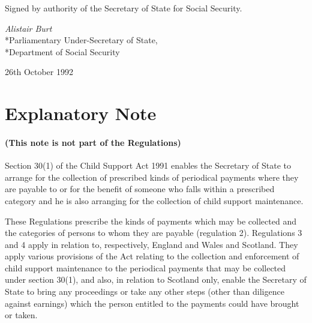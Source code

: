 \documentclass[12pt,a4paper]{article}
\begin{document}

\bigskip

Signed by authority of the Secretary of State for Social Security.

{\raggedleft
\emph{Alistair Burt}\\*Parliamentary Under-Secretary of State,\\*Department of Social Security

}

26th October 1992

\part{Explanatory Note}

\renewcommand\parthead{--- Explanatory Note}

\subsection*{(This note is not part of the Regulations)}

 Section 30(1) of the Child Support Act 1991 enables the Secretary of State to arrange for the collection of prescribed kinds of periodical payments where they are payable to or for the benefit of someone who falls within a prescribed category and he is also arranging for the collection of child support maintenance.

  These Regulations prescribe the kinds of payments which may be collected and the categories of persons to whom they are payable (regulation 2). Regulations 3 and 4 apply in relation to, respectively, England and Wales and Scotland. They apply various provisions of the Act relating to the collection and enforcement of child support maintenance to the periodical payments that may be collected under section 30(1), and also, in relation to Scotland only, enable the Secretary of State to bring any proceedings or take any other steps (other than diligence against earnings) which the person entitled to the payments could have brought or taken.
\end{document}
